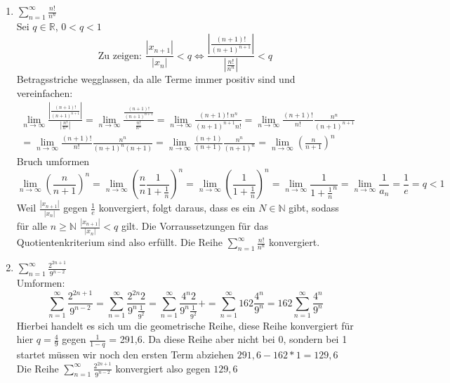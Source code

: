 \documentclass{article}
\begin{document}
\begin{enumerate}[ label= (\roman*) ]
        \item \( \sum_{n=1}^{\infty} \frac{n!}{n^n} \) \\
        Sei \(q \in \mathbb{R}\), \(0 < q < 1\) \\
        \[ \text{Zu zeigen: } \frac{|x_{n+1}|}{|x_{n}|} < q \Leftrightarrow  \frac{  \left| \frac{(n+1)!}{{(n+1)}^{n+1}} \right| }{ \left| \frac{n!}{n^n} \right| } < q \]
        Betragsstriche wegglassen, da alle Terme immer positiv sind und vereinfachen:
        \begin{gather*}
            \lim_{n \to \infty} \frac{|\frac{(n+1)!}{{(n+1)}^{n+1}}|}{|\frac{n!}{n^n}|}
            = \lim_{n \to \infty} \frac{\frac{(n+1)!}{{(n+1)}^{n+1}}}{\frac{n!}{n^n}}
            = \lim_{n \to \infty} \frac{(n+1)! \: n^n}{ {(n+1)}^{n+1} n! }
            = \lim_{n \to \infty} \frac{(n+1)!}{n!} \frac{n^n}{{(n+1)}^{n+1}} \\
            = \lim_{n \to \infty} \frac{(n+1)!}{n!} \frac{n^n}{ {(n+1)}^{n} (n+1)}
            = \lim_{n \to \infty} \frac{(n+1)}{(n+1)} \frac{n^n}{{(n+1)}^{n}} 
            = \lim_{n \to \infty} {\left( \frac{n}{n+1} \right)}^n 
        \end{gather*}
        Bruch umformen
        \[
            \lim_{n \to \infty} {\left( \frac{n}{n+1} \right)}^{n} =
            \lim_{n \to \infty} {\left( \frac{n}{n} \frac{1}{1+ \frac{1}{n}} \right)}^{n} =
            \lim_{n \to \infty} {\left( \frac{1}{1+ \frac{1}{n}} \right)}^{n} = 
            \lim_{n \to \infty} \frac{1}{ { 1 + \frac{1}{n} }^{n} } =
            \lim_{n \to \infty} \frac{1}{ a_n } =
            \frac{1}{e} = q < 1
        \]
        Weil \(\frac{|x_{n+1}|}{|x_{n}|}\) gegen \(\frac{1}{e}\) konvergiert,
        folgt daraus, dass es ein \(N \in \mathbb{N}\) gibt, sodass für alle \(n \geq \mathbb{N} \) \(\frac{|x_{n+1}|}{|x_{n}|} < q\) gilt.
        Die Vorraussetzungen für das Quotientenkriterium sind also erfüllt.
        Die Reihe \( \sum_{n=1}^{\infty} \frac{n!}{n^n} \) konvergiert.

        \item \( \sum_{n=1}^{\infty} \frac{ 2^{2n+1} }{ 9^{n-2}} \) \\
        Umformen:
        \[
            \sum_{n=1}^{\infty} \frac{ 2^{2n+1} }{ 9^{n-2}}
            = \sum_{n=1}^{\infty} \frac{ 2^{2n} 2 }{ 9^{n} \frac{1}{9^2}}
            = \sum_{n=1}^{\infty} \frac{ 4^{n} 2 }{ 9^{n} \frac{1}{9^2}}+
            = \sum_{n=1}^{\infty} 162 \frac{ 4^{n} }{ 9^{n} }
            = 162 \sum_{n=1}^{\infty} \frac{ 4^{n} }{ 9^{n} }
         \]
         Hierbei handelt es sich um die geometrische Reihe, diese Reihe konvergiert für hier \(q = \frac{4}{9}\) gegen \(\frac{1}{1-q}\) = 291,6.
         Da diese Reihe aber nicht bei 0, sondern bei 1 startet müssen wir noch den ersten Term abziehen \(291,6 - 162*1 = 129,6\)
         Die Reihe \( \sum_{n=1}^{\infty} \frac{ 2^{2n+1} }{ 9^{n-2}} \) konvergiert also gegen \(129,6\)
    \end{enumerate}
\end{document}
